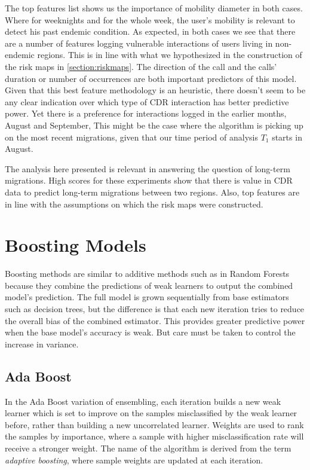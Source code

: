 The top features list shows us the importance of mobility diameter in both cases.
Where for weeknights and for the whole week, the user's mobility is  relevant to detect his past endemic condition.
As expected, in both cases we see that there are a number of features logging vulnerable interactions of users living in non-endemic regions.
This is in line with what we hypothesized in the construction of the risk maps in \cref{section:riskmaps}.
The direction of the call and the calls' duration or number of occurrences are both important predictors of this model.
Given that this best feature methodology is an heuristic, there doesn't seem to be any clear indication over which type of CDR interaction has better predictive power.
Yet there is a preference for interactions logged in the earlier months, August and September,
This might be the case where the algorithm is picking up on the most recent migrations, given that our time period of analysis $T_1$ starts in August.

The analysis here presented is relevant in answering the question of long-term migrations.
High scores for these experiments show that there is value in CDR data to predict long-term migrations between two regions.
Also, top features are in line with the assumptions on which the risk maps were constructed.



\section{Boosting Models}\label{section:gradient_boosting}

Boosting methods are similar to additive methods such as in Random Forests because they combine the predictions of weak learners to output the combined model's prediction.
The full model is grown sequentially from base estimators such as decision trees, but the difference is that each new iteration tries to reduce the overall bias of the combined estimator.
This provides greater predictive power when the base model's accuracy is weak. But care must be taken to control the increase in variance.

\subsection{Ada Boost}

In the Ada Boost variation of ensembling, each iteration builds a new weak learner which is set to improve on the samples misclassified by the weak learner before, rather than building a new uncorrelated learner.
Weights are used to rank the samples by importance, where a sample with higher misclassification rate will receive a stronger weight.
The name of the algorithm is derived from the term \textit{adaptive boosting}, where sample weights are updated at each iteration.


